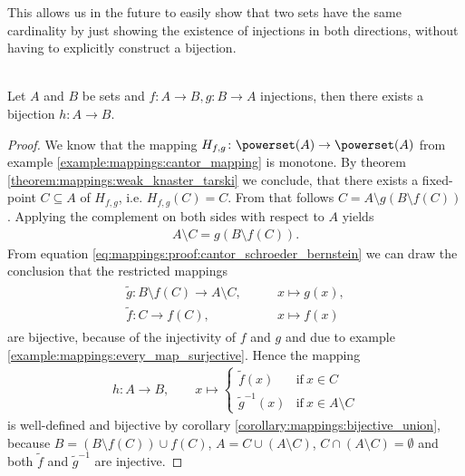 This allows us in the future to easily show that two sets have the same cardinality by just showing the existence of injections in both directions, without having to explicitly construct a bijection.

\begin{theorem}\label{theorem:mappings:cantor_schroeder_bernstein}%
    ~\\Let $A$ and $B$ be sets and $f\colon A\rightarrow B,g\colon B\rightarrow A$ injections, then there exists a bijection $h\colon A\rightarrow B$.
\end{theorem}
\begin{proof}
    We know that the mapping $H_{f,g}\colon\powerset(A)\rightarrow\powerset(A)$ from example \ref{example:mappings:cantor_mapping} is monotone. By theorem \ref{theorem:mappings:weak_knaster_tarski} we conclude, that there exists a fixed-point $C\subseteq A$ of $H_{f,g}$, i.e. $H_{f,g}(C)=C$. From that follows $C=A\setminus g(B\setminus f(C))$.  Applying the complement on both sides with respect to $A$ yields
    \begin{align}A\setminus C=g(B\setminus f(C)).\label{eq:mappings:proof:cantor_schroeder_bernstein}\end{align}
    From equation \eqref{eq:mappings:proof:cantor_schroeder_bernstein} we can draw the conclusion that the restricted mappings \begin{align}\begin{split}\tilde g\colon B\setminus f(C)\rightarrow A\setminus C,&\qquad x\mapsto g(x),\\ \tilde f\colon C\rightarrow f(C),&\qquad x\mapsto f(x)\end{split}\end{align} are bijective, because of the injectivity of $f$ and $g$ and due to example \ref{example:mappings:every_map_surjective}. Hence the mapping
    \begin{align}h\colon A\rightarrow B,\qquad x\mapsto \begin{cases}\tilde f(x)&\text{if}\ x\in C\\ \tilde g^{-1}(x)&\text{if}\ x\in A\setminus C\end{cases}\end{align}
    is well-defined and bijective by corollary \ref{corollary:mappings:bijective_union}, because $B=(B\setminus f(C))\cup f(C)$, $A=C\cup(A\setminus C)$, $C\cap (A\setminus C)=\emptyset$ and both $\tilde f$ and $\tilde g^{-1}$ are injective.
\end{proof}

